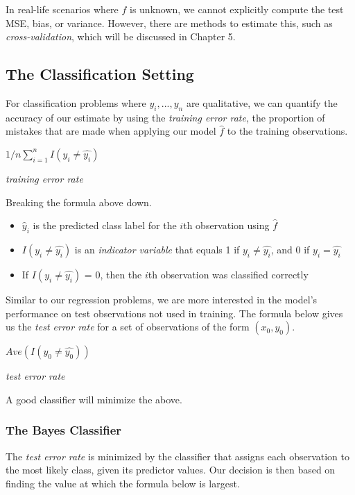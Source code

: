 \documentclass[]{book}
\providecommand{\tightlist}{%
  \setlength{\itemsep}{0pt}\setlength{\parskip}{0pt}}
\theoremstyle{definition}
\theoremstyle{definition}
\theoremstyle{definition}
\theoremstyle{remark}
\begin{document}
In real-life scenarios where \(f\) is unknown, we cannot explicitly
compute the test MSE, bias, or variance. However, there are methods to
estimate this, such as \emph{cross-validation}, which will be discussed
in Chapter 5.

\subsection{The Classification
Setting}\label{the-classification-setting}

For classification problems where \(y_i,...,y_n\) are qualitative, we
can quantify the accuracy of our estimate by using the \emph{training
error rate}, the proportion of mistakes that are made when applying our
model \(\hat{f}\) to the training observations.

\(1/n\sum_{i=1}^nI(y_i \neq \hat{y_i})\)

\emph{training error rate}

Breaking the formula above down.

\begin{itemize}
\tightlist
\item
  \(\hat{y}_i\) is the predicted class label for the \(i\)th observation
  using \(\hat{f}\)
\item
  \(I(y_i \neq \hat{y_i})\) is an \emph{indicator variable} that equals
  1 if \(y_i \neq \hat{y_i}\), and 0 if \(y_i = \hat{y_i}\)
\item
  If \(I(y_i \neq \hat{y_i})\) = 0, then the \(i\)th observation was
  classified correctly
\end{itemize}

Similar to our regression problems, we are more interested in the
model's performance on test observations not used in training. The
formula below gives us the \emph{test error rate} for a set of
observations of the form \((x_0, y_0)\).

\(Ave(I(y_0 \neq \hat{y_0}))\)

\emph{test error rate}

A good classifier will minimize the above.

\subsubsection{The Bayes Classifier}\label{the-bayes-classifier}

The \emph{test error rate} is minimized by the classifier that assigns
each observation to the most likely class, given its predictor values.
Our decision is then based on finding the value at which the formula
below is largest.
\end{document}
